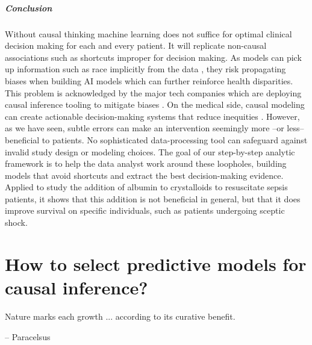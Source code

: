 \documentclass[french,12pt,twoside,a4paper]{book}
\newenvironment{citationbox}{
  \begin{tcolorbox}[
      enhanced,
      colback=gray!10, %
      colframe=white, %
      arc=0mm, %
      boxrule=0.5pt, %
      rightrule=0pt, %
      left=0pt, %
      right=0pt, %
      top=0pt, %
      bottom=0pt, %
      rightupper=0mm, %
      rightlower=0mm, %
      width=0.9\textwidth,
      flush right,
    ]
    \footnotesize %
    \itshape %
    }{
  \end{tcolorbox}%
}
\begin{document}
\paragraph{Conclusion}

Without causal thinking machine learning does not suffice for optimal
clinical decision making for each and every patient. It will replicate
non-causal associations such as shortcuts improper for decision making.
As models can pick up information such as race implicitly from the data
\citep{adam2022write}, they risk propagating biases when building AI
models which can further reinforce health disparities. This problem is
acknowledged by the major tech companies which are deploying
causal inference tooling to mitigate biases
\citep{tensorflow_responsible_ai, microsoft_responsible_ai, pwc_responsible_ai}.
%
On the medical side, causal modeling can create actionable
decision-making systems that reduce inequities
\citep{mitra2022future,ehrmann2023making}.
%
However, as we have seen, subtle errors can make an intervention seemingly more
--or less-- beneficial to patients. No sophisticated data-processing
tool can safeguard against invalid study design or modeling choices.
%
The goal of our step-by-step analytic framework is to help the data
analyst work around these loopholes, building models that avoid shortcuts
and extract the best decision-making evidence.
%
Applied to study the addition of albumin to crystalloids to
resuscitate sepsis patients, it shows that this addition is not
beneficial in general, but that it does improve survival on
specific individuals, such as patients undergoing sceptic shock.



\chapter{How to select predictive models for causal inference?}\label{chapter:causal_model_selection}

\begin{citationbox}
  Nature marks each growth ... according to its curative benefit.
  \par\hfill -- Paracelsus
\end{citationbox}
\end{document}
